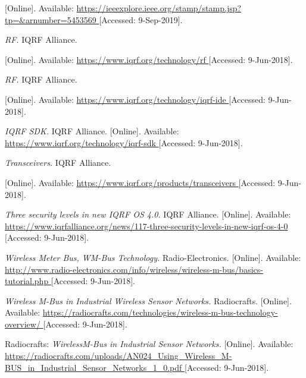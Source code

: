 \begin{thebibliography}{9}

[Online]. Available:
\url{
https://ieeexplore.ieee.org/stamp/stamp.jsp?tp=&arnumber=5453569
}
[Accessed: 9-Sep-2019].

\textit{
RF.
}
IQRF Alliance.

[Online]. Available:
\url{
https://www.iqrf.org/technology/rf
}
[Accessed: 9-Jun-2018].



\textit{
RF.
}
IQRF Alliance.

[Online]. Available:
\url{
https://www.iqrf.org/technology/iqrf-ide
}
[Accessed: 9-Jun-2018].




\textit{
IQRF SDK.
}
IQRF Alliance.
[Online]. Available:
\url{
https://www.iqrf.org/technology/iqrf-sdk
}
[Accessed: 9-Jun-2018].



\textit{
Transceivers.
}
IQRF Alliance.

[Online]. Available:
\url{
https://www.iqrf.org/products/transceivers
}
[Accessed: 9-Jun-2018].


\textit{
Three security levels in new IQRF OS 4.0.
}
IQRF Alliance.
[Online]. Available:
\url{
https://www.iqrfalliance.org/news/117-three-security-levels-in-new-iqrf-os-4-0
}
[Accessed: 9-Jun-2018].


\textit{
Wireless Meter Bus, WM-Bus Technology.
}
Radio-Electronics.
[Online]. Available:
\url{
http://www.radio-electronics.com/info/wireless/wireless-m-bus/basics-tutorial.php
}
[Accessed: 9-Jun-2018].


\textit{
Wireless M-Bus in Industrial Wireless Sensor Networks.
}
Radiocrafts.
[Online]. Available:
\url{
https://radiocrafts.com/technologies/wireless-m-bus-technology-overview/
}
[Accessed: 9-Jun-2018].



Radiocrafts: 
\textit{
WirelessM-Bus in Industrial Sensor Networks.
}
[Online]. Available:
\url{
https://radiocrafts.com/uploads/AN024_Using_Wireless_M-BUS_in_Industrial_Sensor_Networks_1_0.pdf
}
[Accessed: 9-Jun-2018].


\end{thebibliography}
